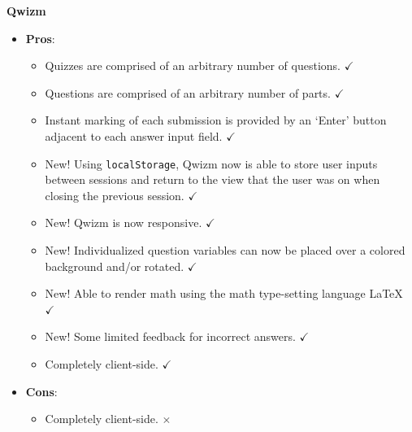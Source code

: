 \documentclass[11pt,xcolor={svgnames, x11names}]{beamer}
\begin{document}
\begin{frame}{\bf Qwizm}
 
	\begin{itemize}	
		\item<1->[] \textcolor{myGreen}{\bf Pros}:
		\begin{itemize}	[<+->] 	
			\item Quizzes are comprised of an arbitrary number of questions. \textcolor{myGreen}{\large $\bm \checkmark$}
			\item Questions are comprised of an arbitrary number of parts. \textcolor{myGreen}{\large $\bm \checkmark$}
			\item Instant marking of each submission is provided by an `Enter' button adjacent to each answer input field. \textcolor{myGreen}{\large $\bm \checkmark$}
			\item \textcolor{myGreen}{New!} Using \texttt{localStorage}, Qwizm now is able to store user inputs between sessions and return to the view that the user was on when closing the previous session. \textcolor{myGreen}{\large $\bm \checkmark$}
			\item \textcolor{myGreen}{New!} Qwizm is now responsive. \textcolor{myGreen}{\large $\bm \checkmark$} 
			\item \textcolor{myGreen}{New!} Individualized question variables can now be placed over a colored background and/or rotated. \textcolor{myGreen}{\large $\bm \checkmark$}
			\item \textcolor{myGreen}{New!} Able to render math using the math type-setting language \LaTeX{} \textcolor{myGreen}{\large $\bm \checkmark$}
			\item \textcolor{myGreen}{New!} Some limited feedback for incorrect answers. \textcolor{myGreen}{\large $\bm \checkmark$} 
			\item Completely client-side. \textcolor{myGreen}{\large $\bm \checkmark$} 			
		\end{itemize}
		\item<10->[] \textcolor{saitMaroon}{\bf Cons}:
		\begin{itemize}
			\item Completely client-side. \textcolor{saitMaroon}{\large $\bm \times $} 
		\end{itemize}
	\end{itemize}
\end{frame}
\end{document}
